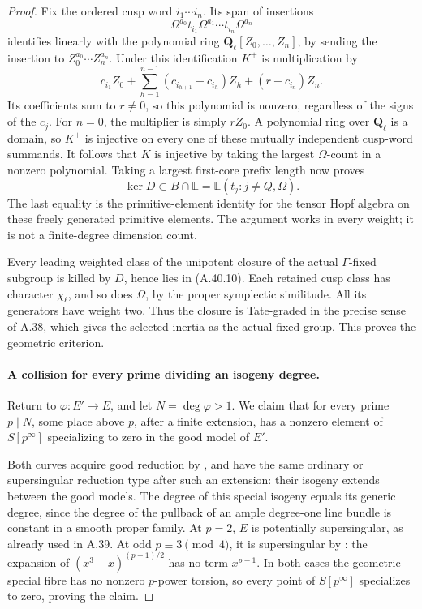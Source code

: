 \begin{proof}
Fix the ordered cusp word \(i_1\cdots i_n\). Its
span of insertions
\[
          \Omega^{a_0}t_{i_1}\Omega^{a_1}
                         \cdots t_{i_n}\Omega^{a_n}
\]
identifies linearly with the polynomial ring
\(\mathbf Q_\ell[Z_0,\ldots,Z_n]\), by sending
the insertion to \(Z_0^{a_0}\cdots Z_n^{a_n}\).
Under this identification \(K^+\) is multiplication
by
\[
 c_{i_1}Z_0+
       \sum_{h=1}^{n-1}(c_{i_{h+1}}-c_{i_h})Z_h
                       +(r-c_{i_n})Z_n.             \tag{A.40.9}
\]
Its coefficients sum to \(r\ne0\), so this
polynomial is nonzero, regardless of the signs of
the \(c_j\). For \(n=0\), the multiplier is simply
\(rZ_0\). A polynomial ring over \(\mathbf Q_\ell\)
is a domain, so \(K^+\) is injective on every one
of these mutually independent cusp-word summands.
It follows that \(K\) is injective by taking the
largest \(\Omega\)-count in a nonzero polynomial.
Taking a largest first-core prefix length now proves
\[
                \ker D\subset B\cap\mathbb L
                    =\mathbb L(t_j:j\ne Q,\Omega).  \tag{A.40.10}
\]
The last equality is the primitive-element identity
for the tensor Hopf algebra on these freely generated
primitive elements. The argument works in every
weight; it is not a finite-degree dimension count.

Every leading weighted class of the unipotent closure
of the actual \(\Gamma\)-fixed subgroup is killed
by \(D\), hence lies in (A.40.10). Each retained
cusp class has character \(\chi_\ell\), and so does
\(\Omega\), by the proper symplectic similitude.
All its generators have weight two. Thus the closure
is Tate-graded in the precise sense of A.38, which
gives the selected inertia as the actual fixed group.
This proves the geometric criterion.

\paragraph{A collision for every prime dividing an isogeny degree.}
Return to \(\varphi:E'\to E\), and let
\(N=\deg\varphi>1\). We claim that for every
prime \(p\mid N\), some place above \(p\), after
a finite extension, has a nonzero element of
\(S[p^\infty]\) specializing to zero in the good
model of \(E'\).

Both curves acquire good reduction
by \cite[Corollary VII.7.2]{fghSilvermanAEC}, and have the
same ordinary or supersingular reduction type after
such an extension: their isogeny extends between
the good models. The degree of this special isogeny
equals its generic degree, since the degree of the
pullback of an ample degree-one line bundle is
constant in a smooth proper family. At \(p=2\),
\(E\) is potentially supersingular, as already used
in A.39. At odd \(p\equiv3\pmod4\), it is
supersingular by
\cite[Theorem V.4.1(a), Example V.4.5]{fghSilvermanAEC}:
the expansion of \((x^3-x)^{(p-1)/2}\) has no
term \(x^{p-1}\). In both cases the geometric
special fibre has no nonzero \(p\)-power torsion,
so every point of \(S[p^\infty]\) specializes to
zero, proving the claim.


\end{proof}
